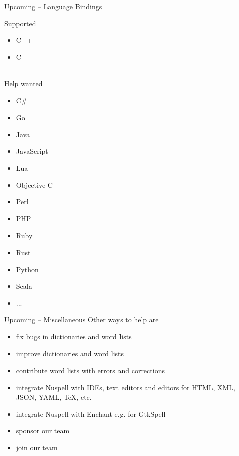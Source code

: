 \documentclass{beamer}
\begin{document}
\begin{frame}{Upcoming – Language Bindings}
\begin{multicols}{2}
Supported
\begin{itemize}
\item C++
\item C
\end{itemize}
\mbox{}\\
Help wanted
\begin{itemize}
\item C\#
\item Go
\item Java
\item JavaScript
\item Lua
\item Objective-C
\item Perl
\item PHP
\item Ruby
\item Rust
\item Python
\item Scala
\item ...
\end{itemize}
\end{multicols}
\end{frame}

\begin{frame}{Upcoming – Miscellaneous}
Other ways to help are
\begin{itemize}
\item fix bugs in dictionaries and word lists
\item improve dictionaries and word lists
\item contribute word lists with errors and corrections
\item integrate Nuspell with IDEs, text editors and editors for HTML, XML, JSON, YAML, \TeX{}, etc.
\item integrate Nuspell with Enchant e.g. for GtkSpell
\item sponsor our team
\item join our team
\end{itemize}
\end{frame}
\end{document}
